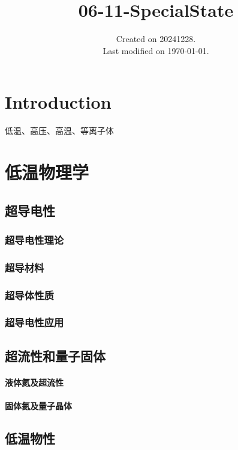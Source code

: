 \documentclass[UTF8]{../06-Physics}
\begin{document}
\title{06-11-SpecialState}
\date{Created on 20241228.\\   Last modified on \today.}
\maketitle
\tableofcontents





\chapter{Introduction}


低温、高压、高温、等离子体



\chapter{低温物理学}
\section{超导电性}
    \subsection{超导电性理论}
    \subsection{超导材料}
    \subsection{超导体性质}
    \subsection{超导电性应用}

\section{超流性和量子固体}
    \subsubsection{液体氦及超流性}
    \subsubsection{固体氦及量子晶体}
\section{低温物性}
\end{document}
